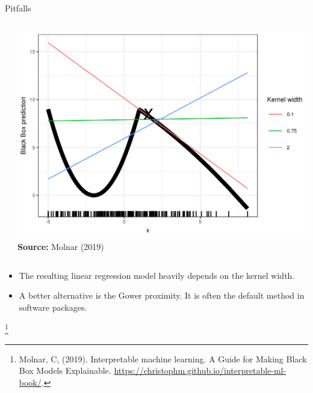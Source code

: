 \documentclass[11pt,compress,t,notes=noshow, xcolor=table]{beamer}
\begin{document}
\begin{vbframe}{Pitfalls}
\begin{columns}
\begin{column}{0.47\textwidth}
\begin{itemize}
  \end{itemize}
  \end{column}
  \begin{column}{0.46\textwidth}  
        \begin{center}
        \includegraphics[width=1\textwidth]{figure/lime-fail-1}
        \tiny{\textbf{Source:} Molnar (2019)}
      \end{center}
  \end{column}
\end{columns}
\begin{itemize}
	\item The resulting linear regression model heavily depends on the kernel width.
	\item A better alternative is the Gower proximity. It is often the default method in software packages. 
\end{itemize}
\vspace{0.3cm}

\footnote[frame]{Molnar, C, (2019). Interpretable machine learning. A Guide for Making Black Box Models Explainable. \url{https://christophm.github.io/interpretable-ml-book/}.}

\end{vbframe}
\end{document}
